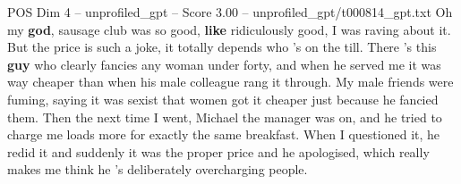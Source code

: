 \begin{textsample}{POS Dim 4 – unprofiled\_gpt – Score 3.00 – unprofiled\_gpt/t000814\_gpt.txt}  \label{ex:f4_pos_022}
Oh my \textbf{god}, sausage club was so good, \textbf{like} ridiculously good, I was raving about it.
But the price is such a joke, it totally depends who 's on the till.
There ’s this \textbf{guy} who clearly fancies any woman under forty, and when he served me it was way cheaper than when his male colleague rang it through.
My male friends were fuming, saying it was sexist that women got it cheaper just because he fancied them.
Then the next time I went, Michael the manager was on, and he tried to charge me loads more for exactly the same breakfast.
When I questioned it, he redid it and suddenly it was the proper price and he apologised, which really makes me think he ’s deliberately overcharging people.

\end{textsample}
